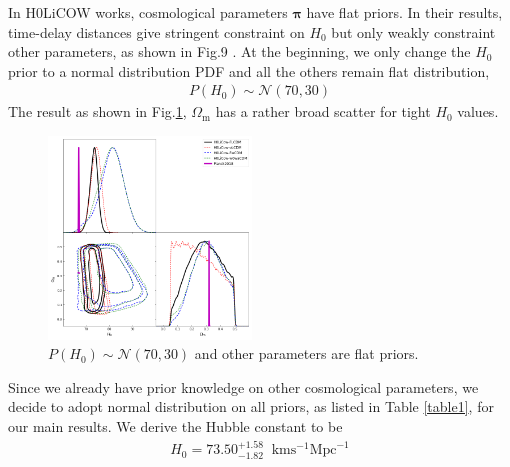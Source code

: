 \documentclass{cosmo}
\begin{document}
    In H0LiCOW works, cosmological parameters $\boldsymbol{\pi}$ have flat priors. In their results, time-delay distances give stringent constraint on $H_\mathrm{0}$ but only weakly constraint other parameters, as shown in Fig.9 \cite{Wong2016}. At the beginning, we only change the $H_\mathrm{0}$ prior to a normal distribution PDF and all the others remain flat distribution,
    \begin{align*}
        P(H_\mathrm{0}) \sim \mathcal{N} (70,30)
    \end{align*}
    The result as shown in Fig.\ref{fig7}, $\Omega_\mathrm{m}$ has a rather broad scatter for tight $H_\mathrm{0}$ values.
    \begin{figure}[h]
        \centering
        \includegraphics[width=0.48\textwidth]{H0LiCOW-Planck-H0N.png}
        \caption{$P(H_\mathrm{0}) \sim \mathcal{N}(70,30)$ and other parameters are flat priors.}
        \label{fig7}
    \end{figure}
    Since we already have prior knowledge on other cosmological parameters, we decide to adopt normal distribution on all priors, as listed in Table \ref{table1}, for our main results. We derive the Hubble constant to be 
    \begin{align*}
        H_\mathrm{0} = {{{73.50}}}_{{-1.82}}^{{+1.58}} \;\; \mathrm{km}\mathrm{s}^{-1}\mathrm{Mpc}^{-1}
    \end{align*}
\end{document}

